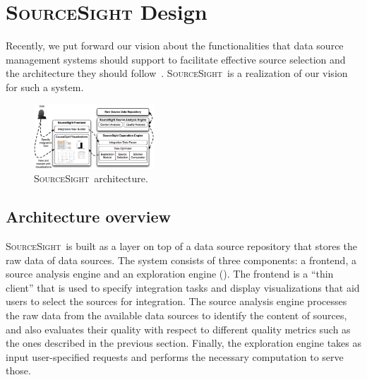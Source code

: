 \documentclass{vldb}
\newcommand\system{\textsc{SourceSight}}
\begin{document}
\section{{\Large \system} Design}
\label{sec:design}
Recently, we put forward our vision about the functionalities that data source management systems should support to facilitate effective source selection and the architecture they should follow~\cite{rekatsinas:2015}. 
\system~is a realization of our vision for such a system. %


\begin{figure}[h]
    \centering
    \includegraphics[width=0.4\textwidth]{fig/srcsightOver}
    	\vspace{-10pt}
    \caption{\system~architecture.}
    \label{fig:architecture}
    	\vspace{-10pt}
\end{figure}

\subsection{Architecture overview}
\system~is built as a layer on top of a data source repository that stores the raw data of data sources. The system consists of three components: a frontend, a source analysis engine and an exploration engine (). The frontend is a ``thin client'' that is used to specify integration tasks and display visualizations that aid users to select the sources for integration. The source analysis engine processes the raw data from the available data sources to identify the content of sources, and also evaluates their quality with respect to different quality metrics such as the ones described in the previous section. Finally, the exploration engine takes as input user-specified requests and performs the necessary computation to serve those.
\end{document}
